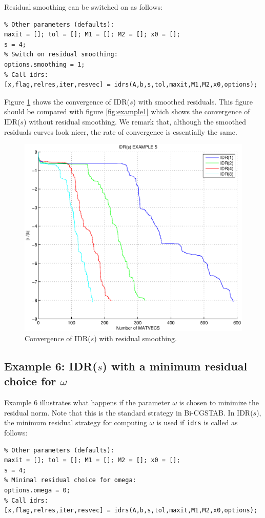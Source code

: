 \documentclass[prodmode,acmtoms]{acmsmall}
\begin{document}
Residual smoothing can be switched on as follows:
\begin{verbatim}
% Other parameters (defaults):
maxit = []; tol = []; M1 = []; M2 = []; x0 = [];
s = 4;
% Switch on residual smoothing:
options.smoothing = 1;
% Call idrs:
[x,flag,relres,iter,resvec] = idrs(A,b,s,tol,maxit,M1,M2,x0,options);
\end{verbatim}

Figure \ref{fig:example5} shows the convergence of IDR($s$) with smoothed residuals. This figure should be
compared with figure \ref{fig:example1} which shows the convergence of IDR($s$) without residual smoothing.
We remark that, although the smoothed residuals curves look nicer, the rate of convergence is essentially the same.
\begin{figure}
\centering
\includegraphics[width=.60\linewidth]{example5}
\caption{Convergence of IDR($s$) with residual smoothing.}
\label{fig:example5}
\end{figure}

\subsection{Example 6: IDR($s$) with a minimum residual choice for $\omega$}
Example 6 illustrates what happens if the parameter $\omega$ is chosen to minimize the residual norm. Note that
this is the standard strategy in Bi-CGSTAB. In IDR($s$), the minimum residual strategy for computing $\omega$ 
is used if {\tt idrs} is called as follows:
\begin{verbatim}
% Other parameters (defaults):
maxit = []; tol = []; M1 = []; M2 = []; x0 = [];
s = 4;
% Minimal residual choice for omega:
options.omega = 0;
% Call idrs:
[x,flag,relres,iter,resvec] = idrs(A,b,s,tol,maxit,M1,M2,x0,options);
\end{verbatim}
\end{document}
